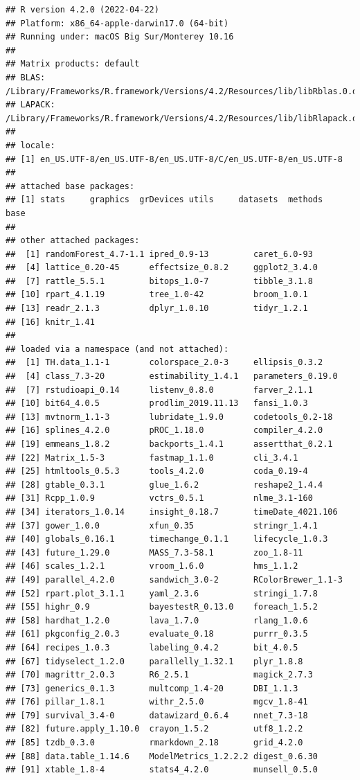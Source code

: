 \documentclass[
]{article}
\begin{document}
\begin{verbatim}
## R version 4.2.0 (2022-04-22)
## Platform: x86_64-apple-darwin17.0 (64-bit)
## Running under: macOS Big Sur/Monterey 10.16
## 
## Matrix products: default
## BLAS:   /Library/Frameworks/R.framework/Versions/4.2/Resources/lib/libRblas.0.dylib
## LAPACK: /Library/Frameworks/R.framework/Versions/4.2/Resources/lib/libRlapack.dylib
## 
## locale:
## [1] en_US.UTF-8/en_US.UTF-8/en_US.UTF-8/C/en_US.UTF-8/en_US.UTF-8
## 
## attached base packages:
## [1] stats     graphics  grDevices utils     datasets  methods   base     
## 
## other attached packages:
##  [1] randomForest_4.7-1.1 ipred_0.9-13         caret_6.0-93        
##  [4] lattice_0.20-45      effectsize_0.8.2     ggplot2_3.4.0       
##  [7] rattle_5.5.1         bitops_1.0-7         tibble_3.1.8        
## [10] rpart_4.1.19         tree_1.0-42          broom_1.0.1         
## [13] readr_2.1.3          dplyr_1.0.10         tidyr_1.2.1         
## [16] knitr_1.41          
## 
## loaded via a namespace (and not attached):
##  [1] TH.data_1.1-1        colorspace_2.0-3     ellipsis_0.3.2      
##  [4] class_7.3-20         estimability_1.4.1   parameters_0.19.0   
##  [7] rstudioapi_0.14      listenv_0.8.0        farver_2.1.1        
## [10] bit64_4.0.5          prodlim_2019.11.13   fansi_1.0.3         
## [13] mvtnorm_1.1-3        lubridate_1.9.0      codetools_0.2-18    
## [16] splines_4.2.0        pROC_1.18.0          compiler_4.2.0      
## [19] emmeans_1.8.2        backports_1.4.1      assertthat_0.2.1    
## [22] Matrix_1.5-3         fastmap_1.1.0        cli_3.4.1           
## [25] htmltools_0.5.3      tools_4.2.0          coda_0.19-4         
## [28] gtable_0.3.1         glue_1.6.2           reshape2_1.4.4      
## [31] Rcpp_1.0.9           vctrs_0.5.1          nlme_3.1-160        
## [34] iterators_1.0.14     insight_0.18.7       timeDate_4021.106   
## [37] gower_1.0.0          xfun_0.35            stringr_1.4.1       
## [40] globals_0.16.1       timechange_0.1.1     lifecycle_1.0.3     
## [43] future_1.29.0        MASS_7.3-58.1        zoo_1.8-11          
## [46] scales_1.2.1         vroom_1.6.0          hms_1.1.2           
## [49] parallel_4.2.0       sandwich_3.0-2       RColorBrewer_1.1-3  
## [52] rpart.plot_3.1.1     yaml_2.3.6           stringi_1.7.8       
## [55] highr_0.9            bayestestR_0.13.0    foreach_1.5.2       
## [58] hardhat_1.2.0        lava_1.7.0           rlang_1.0.6         
## [61] pkgconfig_2.0.3      evaluate_0.18        purrr_0.3.5         
## [64] recipes_1.0.3        labeling_0.4.2       bit_4.0.5           
## [67] tidyselect_1.2.0     parallelly_1.32.1    plyr_1.8.8          
## [70] magrittr_2.0.3       R6_2.5.1             magick_2.7.3        
## [73] generics_0.1.3       multcomp_1.4-20      DBI_1.1.3           
## [76] pillar_1.8.1         withr_2.5.0          mgcv_1.8-41         
## [79] survival_3.4-0       datawizard_0.6.4     nnet_7.3-18         
## [82] future.apply_1.10.0  crayon_1.5.2         utf8_1.2.2          
## [85] tzdb_0.3.0           rmarkdown_2.18       grid_4.2.0          
## [88] data.table_1.14.6    ModelMetrics_1.2.2.2 digest_0.6.30       
## [91] xtable_1.8-4         stats4_4.2.0         munsell_0.5.0
\end{verbatim}
\end{document}
